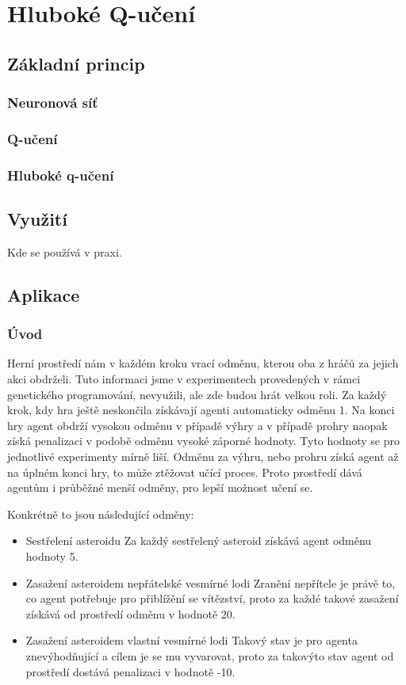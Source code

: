 \chapter{Hluboké Q-učení}

\section{Základní princip}
\subsection{Neuronová síť}

\subsection{Q-učení}
\subsection{Hluboké q-učení}

\section{Využití}
Kde se používá v praxi.


\section{Aplikace}
\subsection{Úvod}
Herní prostředí nám v každém kroku vrací odměnu, kterou oba z hráčů za jejich akci obdrželi. Tuto informaci jsme v experimentech provedených v rámci genetického programování, nevyužili, ale zde budou hrát velkou roli.
Za každý krok, kdy hra ještě neskončila získávají agenti automaticky odměnu 1. Na konci hry agent obdrží vysokou odměnu v případě výhry a v případě prohry naopak získá penalizaci v podobě odměnu vysoké záporné hodnoty. Tyto hodnoty se pro jednotlivé experimenty mírně liší.
Odměnu za výhru, nebo prohru získá agent až na úplném konci hry, to může ztěžovat učící proces. Proto prostředí dává agentům i průběžné menší odměny, pro lepší možnost učení se.

Konkrétně to jsou následující odměny:
\begin{itemize}
    \item Sestřelení asteroidu
        \newline
        Za každý sestřelený asteroid získává agent odměnu hodnoty 5.
    \item Zasažení asteroidem nepřátelské vesmírné lodi
        \newline
        Zranění nepřítele je právě to, co agent potřebuje pro přiblížění se vítězství, proto za každé takové zasažení získává od prostředí odměnu v hodnotě 20.
    \item Zasažení asteroidem vlastní vesmírné lodi
        \newline
        Takový stav je pro agenta znevýhodňující a cílem je se mu vyvarovat, proto za takovýto stav agent od prostředí dostává penalizaci v hodnotě -10.
\end{itemize}


